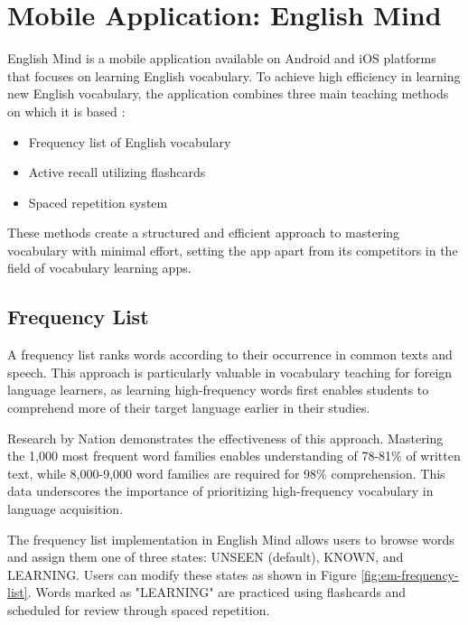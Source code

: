 \chapter{Mobile Application: English Mind}
\label{chap:mobile-application-english-mind}

English Mind is a mobile application available on Android \cite{cite:english_mind_play_store} and iOS \cite{cite:english_mind_app_store} platforms that focuses on learning English vocabulary. To achieve high efficiency in learning new English vocabulary, the application combines three main teaching methods on which it is based \cite{cite:english_mind_website}:

\begin{itemize}
    \item Frequency list of English vocabulary
    \item Active recall utilizing flashcards
    \item Spaced repetition system
\end{itemize}

These methods create a structured and efficient approach to mastering vocabulary with minimal effort, setting the app apart from its competitors in the field of vocabulary learning apps.

\section{Frequency List}

A frequency list ranks words according to their occurrence in common texts and speech. This approach is particularly valuable in vocabulary teaching for foreign language learners, as learning high-frequency words first enables students to comprehend more of their target language earlier in their studies.

Research by Nation \cite{cite:nation2006_how_large_vocabulary_is_needed} demonstrates the effectiveness of this approach. Mastering the 1,000 most frequent word families enables understanding of 78-81\% of written text, while 8,000-9,000 word families are required for 98\% comprehension. This data underscores the importance of prioritizing high-frequency vocabulary in language acquisition.\newpage

The frequency list implementation in English Mind allows users to browse words and assign them one of three states: UNSEEN (default), KNOWN, and LEARNING. Users can modify these states as shown in Figure \ref{fig:em-frequency-list}. Words marked as "LEARNING" are practiced using flashcards and scheduled for review through spaced repetition.

